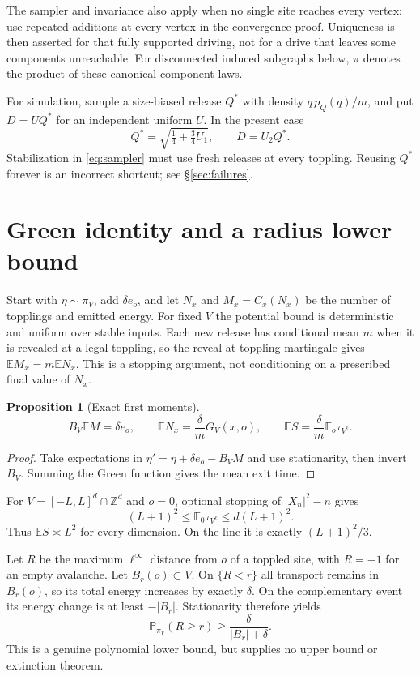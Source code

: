 \documentclass[11pt]{article}
\numberwithin{equation}{section}
\newtheorem{proposition}[theorem]{Proposition}
\theoremstyle{definition}
\newcommand{\E}{\mathbb E}
\newcommand{\Prob}{\mathbb P}
\newcommand{\Z}{\mathbb Z}
\begin{document}
The sampler and invariance also apply when no single site reaches every vertex: use repeated additions at every vertex in the convergence proof. Uniqueness is then asserted for that fully supported driving, not for a drive that leaves some components unreachable. For disconnected induced subgraphs below, $\pi$ denotes the product of these canonical component laws.

For simulation, sample a size-biased release $Q^*$ with density $q\,p_Q(q)/m$, and put $D=UQ^*$ for an independent uniform $U$. In the present case
\[
 Q^*=\sqrt{\tfrac14+\tfrac34 U_1},\qquad D=U_2Q^*.
\]
Stabilization in \eqref{eq:sampler} must use fresh releases at every toppling. Reusing $Q^*$ forever is an incorrect shortcut; see \S\ref{sec:failures}.

\section{Green identity and a radius lower bound}\label{sec:green}

Start with $\eta\sim\pi_V$, add $\delta e_o$, and let $N_x$ and $M_x=C_x(N_x)$ be the number of topplings and emitted energy. For fixed $V$ the potential bound is deterministic and uniform over stable inputs. Each new release has conditional mean $m$ when it is revealed at a legal toppling, so the reveal-at-toppling martingale gives $\E M_x=m\E N_x$. This is a stopping argument, not conditioning on a prescribed final value of $N_x$.

\begin{proposition}[Exact first moments]\label{prop:green}
\begin{equation}\label{eq:green}
 B_V\E M=\delta e_o,\qquad
 \E N_x=\frac\delta mG_V(x,o),\qquad
 \E S=\frac\delta m\E_o\tau_{V^c}.
\end{equation}
\end{proposition}
\begin{proof}
Take expectations in $\eta'=\eta+\delta e_o-B_VM$ and use stationarity, then invert $B_V$. Summing the Green function gives the mean exit time.
\end{proof}
For $V=[-L,L]^d\cap\Z^d$ and $o=0$, optional stopping of $|X_n|^2-n$ gives
\[
 (L+1)^2\le\E_0\tau_{V^c}\le d(L+1)^2.
\]
Thus $\E S\asymp L^2$ for every dimension. On the line it is exactly $(L+1)^2/3$.

Let $R$ be the maximum $\ell^\infty$ distance from $o$ of a toppled site, with $R=-1$ for an empty avalanche. Let $B_r(o)\subset V$. On $\{R<r\}$ all transport remains in $B_r(o)$, so its total energy increases by exactly $\delta$. On the complementary event its energy change is at least $-|B_r|$. Stationarity therefore yields
\begin{equation}\label{eq:radius-lower}
 \Prob_{\pi_V}(R\ge r)\ge\frac{\delta}{|B_r|+\delta}.
\end{equation}
This is a genuine polynomial lower bound, but supplies no upper bound or extinction theorem.
\end{document}

